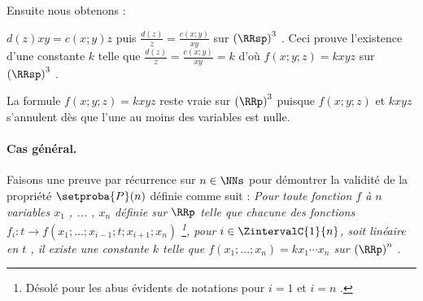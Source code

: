 \medskip

Ensuite nous obtenons :

\smallskip

$d(z) x y = c(x ; y) z$ puis $\frac{d(z)}{z} = \frac{c(x ; y)}{xy}$ sur $\left( \RRsp \right)^3$ . Ceci prouve l'existence d'une constante $k$ telle que $\frac{d(z)}{z} = \frac{c(x ; y)}{xy} = k$ d'où $f(x ; y ; z) = k x y z$ sur $\left( \RRsp \right)^3$ .


\medskip

La formule $f(x ; y ; z) = k x y z$ reste vraie sur $\left( \RRp \right)^3$ puisque $f(x ; y ; z)$ et $k x y z$ s'annulent dès que l'une au moins des variables est nulle.



\paragraph{Cas général.}

Faisons une preuve par récurrence sur $n \in \NNs$ pour démontrer la validité de la propriété $\setproba{P}(n)$ définie comme suit :
\emph{\og Pour toute fonction $f$ à $n$ variables $x_1$ , ... , $x_n$ définie sur $\RRp$ telle que chacune des fonctions $f_i : t \rightarrow f(x_1 ; ... ; x_{i-1} ; t ; x_{i+1} ; x_n)$
\footnote{
	Désolé pour les abus évidents de notations pour $i = 1$ et $i = n$ . 
},
pour $i \in \ZintervalC{1}{n}$, soit linéaire en $t$ , il existe une constante $k$ telle que $f(x_1 ; ... ; x_n) = k x_1 \cdots x_n$ sur $\left( \RRp \right)^n$ \fg}.

